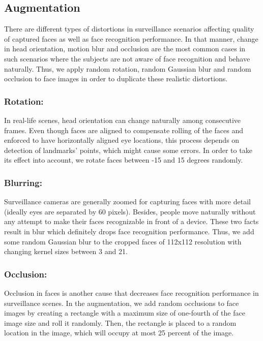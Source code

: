 \documentclass[runningheads]{llncs}
\begin{document}
\subsection{Augmentation}

There are different types of distortions in surveillance scenarios affecting quality of captured faces as well as face recognition performance. In that manner, change in head orientation, motion blur and occlusion are the most common cases in such scenarios where the subjects are not aware of face recognition and behave naturally. Thus, we apply random rotation, random Gaussian blur and random occlusion to face images in order to duplicate these realistic distortions. 

\subsubsection{Rotation:}

In real-life scenes, head orientation can change naturally among consecutive frames. Even though faces are aligned to compensate rolling of the faces and enforced to have horizontally aligned eye locations, this process depends on detection of landmarks' points, which might cause some errors. In order to take its effect into account, we rotate faces between -15 and 15 degrees randomly. 

\subsubsection{Blurring:}

Surveillance cameras are generally zoomed for capturing faces with more detail (ideally eyes are separated by 60 pixels). Besides, people move naturally without any attempt to make their faces recognizable in front of a device. These two facts result in blur which definitely drops face recognition performance. Thus, we add some random Gaussian blur to the cropped faces of 112x112 resolution with changing kernel sizes between 3 and 21.

\subsubsection{Occlusion:}
Occlusion in faces is another cause that decreases face recognition performance in surveillance scenes. In the augmentation, we add random occlusions to face images by creating a rectangle with a maximum size of one-fourth of the face image size and roll it randomly. Then, the rectangle is placed to a random location in the image, which will occupy at most 25 percent of the image. 
\end{document}
